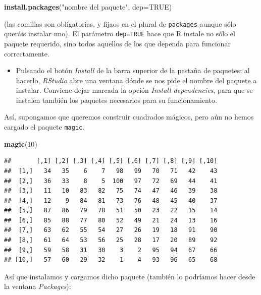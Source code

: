 \documentclass[]{book}
\newenvironment{Shaded}{\begin{snugshade}}{\end{snugshade}}
\newcommand{\DataTypeTok}[1]{\textcolor[rgb]{0.13,0.29,0.53}{#1}}
\newcommand{\DecValTok}[1]{\textcolor[rgb]{0.00,0.00,0.81}{#1}}
\newcommand{\KeywordTok}[1]{\textcolor[rgb]{0.13,0.29,0.53}{\textbf{#1}}}
\newcommand{\NormalTok}[1]{#1}
\newcommand{\OtherTok}[1]{\textcolor[rgb]{0.56,0.35,0.01}{#1}}
\newcommand{\StringTok}[1]{\textcolor[rgb]{0.31,0.60,0.02}{#1}}
\providecommand{\tightlist}{%
  \setlength{\itemsep}{0pt}\setlength{\parskip}{0pt}}
\theoremstyle{definition}
\theoremstyle{definition}
\theoremstyle{definition}
\theoremstyle{remark}
\begin{document}
\begin{Shaded}
\begin{Highlighting}[]
\KeywordTok{install.packages}\NormalTok{(}\StringTok{"nombre del paquete"}\NormalTok{, }\DataTypeTok{dep=}\OtherTok{TRUE}\NormalTok{)}
\end{Highlighting}
\end{Shaded}

(las comillas son obligatorias, y fijaos en el plural de \texttt{packages} aunque sólo queráis instalar uno). El parámetro \texttt{dep=TRUE} hace que R instale no sólo el paquete requerido, sino todos aquellos de los que dependa para funcionar correctamente.

\begin{itemize}
\tightlist
\item
  Pulsando el botón \emph{Install} de la barra superior de la pestaña de paquetes; al hacerlo, \emph{RStudio} abre una ventana dónde se nos pide el nombre del paquete a instalar. Conviene dejar marcada la opción \emph{Install dependencies}, para que se instalen también los paquetes necesarios para su funcionamiento.
\end{itemize}

Así, supongamos que queremos construir cuadrados mágicos, pero aún no hemos cargado el paquete \texttt{magic}.

\begin{Shaded}
\begin{Highlighting}[]
\KeywordTok{magic}\NormalTok{(}\DecValTok{10}\NormalTok{)}
\end{Highlighting}
\end{Shaded}

\begin{verbatim}
##       [,1] [,2] [,3] [,4] [,5] [,6] [,7] [,8] [,9] [,10]
##  [1,]   34   35    6    7   98   99   70   71   42    43
##  [2,]   36   33    8    5  100   97   72   69   44    41
##  [3,]   11   10   83   82   75   74   47   46   39    38
##  [4,]   12    9   84   81   73   76   48   45   40    37
##  [5,]   87   86   79   78   51   50   23   22   15    14
##  [6,]   85   88   77   80   52   49   21   24   13    16
##  [7,]   63   62   55   54   27   26   19   18   91    90
##  [8,]   61   64   53   56   25   28   17   20   89    92
##  [9,]   59   58   31   30    3    2   95   94   67    66
## [10,]   57   60   29   32    1    4   93   96   65    68
\end{verbatim}

Así que instalamos y cargamos dicho paquete (también lo podríamos hacer desde la ventana \emph{Packages}):
\end{document}
